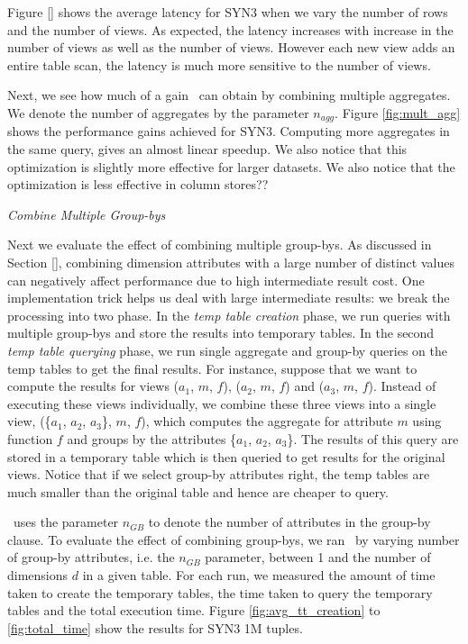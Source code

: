  Figure \ref{} shows the average latency for SYN3 when we vary the number of
 rows and the number of views.
 As expected, the latency increases with increase in the number of views as well
 as the number of views.
 However each new view adds an entire table scan, the latency is much more
 sensitive to the number of views.
 
Next, we see how much of a gain \SeeDB\ can obtain by combining multiple
aggregates. We denote the number of aggregates by the parameter $n_{agg}$.
Figure \ref{fig:mult_agg} shows the performance gains achieved for SYN3. 
Computing more aggregates in the same query, gives an almost linear speedup. 
We also notice that this optimization is slightly more effective for larger
datasets.
We also notice that the optimization is less effective in column stores??

{\it Combine Multiple Group-bys}
\label{sec:mult_gb_expt}

Next we evaluate the effect of combining multiple group-bys.
As discussed in Section \ref{}, combining dimension attributes with a large
number of distinct values can negatively affect performance due to high
intermediate result cost.
One implementation trick helps us deal with large intermediate results: we break
the processing into two phase. 
In the {\it temp table creation} phase, we run queries with multiple group-bys
and store the results into temporary tables.
In the second {\it temp table querying} phase, we run single aggregate and
group-by queries on the temp tables to get the final results.
For instance, suppose that we want to compute the results for views ($a_1$, $m$,
$f$), ($a_2$, $m$, $f$) and ($a_3$, $m$, $f$). Instead of executing these views
individually, we combine these three views into a single view, (\{$a_1$, $a_2$,
$a_3$\}, $m$, $f$), which computes the aggregate for attribute $m$ using
function $f$ and groups by the attributes \{$a_1$, $a_2$, $a_3$\}. The results
of this query are stored in a temporary table which is then queried to get
results for the original views. 
Notice that if we select group-by attributes right, the temp tables are much
smaller than the original table and hence are cheaper to query.

\SeeDB\ uses the parameter $n_{GB}$ to denote the number of attributes in the
group-by clause. To evaluate the effect of combining group-bys, we ran \SeeDB\
by varying number of group-by attributes, i.e. the $n_{GB}$ parameter, between 1
and the number of dimensions $d$ in a given table. For each run, we measured the
amount of time taken to create the temporary tables, the time taken to query the
temporary tables and the total execution time. Figure
\ref{fig:avg_tt_creation} to \ref{fig:total_time} show the
results for SYN3 1M tuples.

